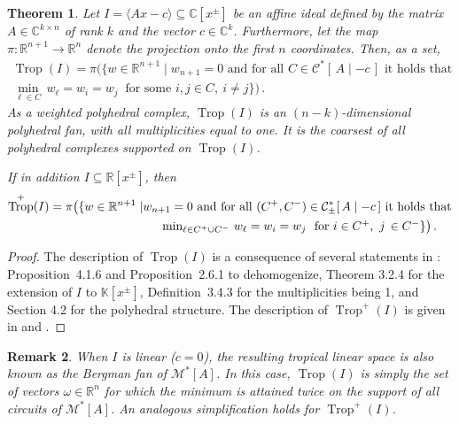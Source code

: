 \documentclass[11pt,reqno,a4paper]{amsart}
\numberwithin{equation}{section}
\theoremstyle{theoremstyle}
\newtheorem{theorem}{Theorem}[section]
\theoremstyle{examplestyle}
\newtheorem{remark}[theorem]{Remark}
\newcommand{\CC}{\mathbb{C}}
\newcommand{\RR}{\mathbb{R}}
\DeclareMathOperator{\Trop}{Trop}
\begin{document}
\begin{theorem}
\label{thm:TropLinearSpace}\label{thm:PosTropLinearSpace}
Let $I =\langle Ax - c\rangle \subseteq \CC[x^\pm]$ be an affine  ideal defined by  the matrix $A\in \CC^{k\times n}$  
of rank $k$ 
and the vector $c\in \CC^k$. Furthermore, let the map $\pi\colon\mathbb{R}^{n+1}\to\mathbb{R}^n$ denote the projection onto the first $n$ coordinates. Then, as a set,
\begin{multline*}
\Trop(I)  = \pi \big(\{ w \in \mathbb{R}^{n+1} \mid 
w_{n+1}=0 \text{ and for all } C \in \mathcal{C}^*[\,A\mid -c\,] \text{ it holds that}   \\  \textstyle\min_{\ell \in C} \, w_\ell = w_i = w_j\   \text{ for some }i,j\in C,\ i\neq j \} \big)\,.
\end{multline*}
As a weighted polyhedral complex, $\Trop(I)$ is an $(n-k)$-dimensional polyhedral fan, with all multiplicities equal to one. It is the coarsest of all polyhedral complexes supported on $\Trop(I)$.
 
If in addition $I  \subseteq \RR[x^\pm]$, then
\begin{align*}
\Trop^+(I)  = \pi \big(\{ w \in \mathbb{R}^{n+1} \mid 
& w_{n+1}=0 \text{ and for all } (C^+,C^-) \in \mathcal{C}^*_\pm[\,A\mid -c\,] \text{ it holds that} \\  & \hspace{5mm} \textstyle\min_{\ell \in C^+\cup C^-} \, w_\ell = w_i = w_j   \ \text{ for }i \in C^+ ,\  j \, \in C^- \} \big)\,.
\end{align*}
\end{theorem}
\begin{proof}
    The description of $\Trop(I)$ is a consequence of several statements in \cite{MaclaganSturmfels15}: Proposition~4.1.6 and  Proposition~2.6.1  to dehomogenize, Theorem 3.2.4 for the extension of $I$ to $\mathbb{K}[x^\pm]$, Definition~3.4.3 for the multiplicities being 1, and Section 4.2 for the polyhedral structure.
       The description of $\Trop^+(I)$ is given in \cite[Proposition~4.1]{ArdilaKlivansWilliams2006} and \cite[Proposition~3.1]{RoseTelek24}. 
\end{proof}

\begin{remark}\label{rmk:linear_ideal}
When $I$ is linear ($c=0$), the resulting tropical linear space is also known as the \emph{Bergman fan} of   $\mathcal{M}^*[A]$.    
In this case, $\Trop(I)$ is simply the set of vectors $\omega\in \RR^n$ for which the minimum is attained twice on the support of all circuits of $\mathcal{M}^*[A]$. An analogous simplification holds for $\Trop^+(I)$.
\end{remark}
\end{document}
